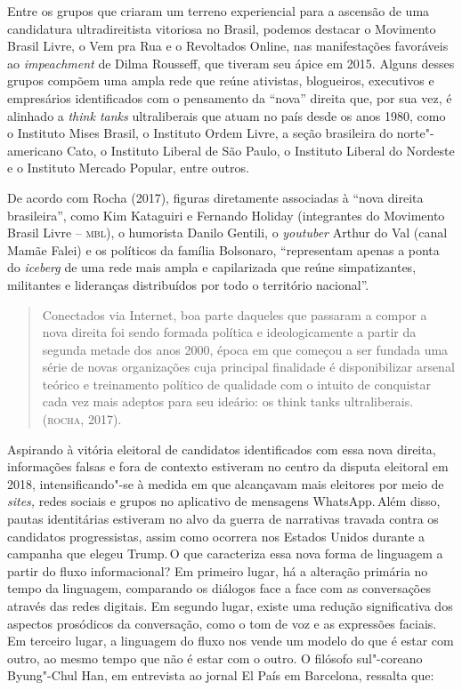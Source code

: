 Entre os grupos que criaram um terreno experiencial para a ascensão de
uma candidatura ultradireitista vitoriosa no Brasil, podemos destacar o
Movimento Brasil Livre, o Vem pra Rua e o Revoltados Online, nas
manifestações favoráveis ao \emph{impeachment} de Dilma Rousseff, que
tiveram seu ápice em 2015. Alguns desses grupos compõem uma ampla rede
que reúne ativistas, blogueiros, executivos e empresários identificados
com o pensamento da ``nova'' direita que, por sua vez, é alinhado a
\emph{think tanks} ultraliberais que atuam no país desde os anos 1980,
como o Instituto Mises Brasil, o Instituto Ordem Livre, a seção
brasileira do norte"-americano Cato, o Instituto Liberal de São Paulo, o
Instituto Liberal do Nordeste e o Instituto Mercado Popular, entre
outros.

De acordo com Rocha (2017), figuras diretamente associadas à ``nova
direita brasileira'', como Kim Kataguiri e Fernando Holiday (integrantes
do Movimento Brasil Livre -- \textsc{mbl}), o humorista Danilo Gentili, o
\emph{youtuber} Arthur do Val (canal Mamãe Falei) e os políticos da
família Bolsonaro, ``representam apenas a ponta do \emph{iceberg} de uma
rede mais ampla e capilarizada que reúne simpatizantes, militantes e
lideranças distribuídos por todo o território nacional''.

\begin{quote}
Conectados via Internet, boa parte daqueles que passaram a compor a nova
direita foi sendo formada política e ideologicamente a partir da segunda
metade dos anos 2000, época em que começou a ser fundada uma série de
novas organizações cuja principal finalidade é disponibilizar arsenal
teórico e treinamento político de qualidade com o intuito de conquistar
cada vez mais adeptos para seu ideário: os think tanks ultraliberais.
(\textsc{rocha}, 2017).
\end{quote}

Aspirando à vitória eleitoral de candidatos identificados com essa nova
direita, informações falsas e fora de contexto estiveram no centro da
disputa eleitoral em 2018, intensificando"-se à medida em que alcançavam
mais eleitores por meio de \emph{sites,} redes sociais e grupos no
aplicativo de mensagens WhatsApp.\,Além disso, pautas identitárias
estiveram no alvo da guerra de narrativas travada contra os candidatos
progressistas, assim como ocorrera nos Estados Unidos durante a campanha
que elegeu Trump.\,O que caracteriza essa nova forma de linguagem a
partir do fluxo informacional? Em primeiro lugar, há a alteração
primária no tempo da linguagem, comparando os diálogos face a face com
as conversações através das redes digitais. Em segundo lugar, existe uma
redução significativa dos aspectos prosódicos da conversação, como o tom
de voz e as expressões faciais. Em terceiro lugar, a linguagem do fluxo
nos vende um modelo do que é estar com outro, ao mesmo tempo que não é
estar com o outro. O filósofo sul"-coreano Byung"-Chul Han, em entrevista
ao jornal El País em Barcelona, ressalta que:

